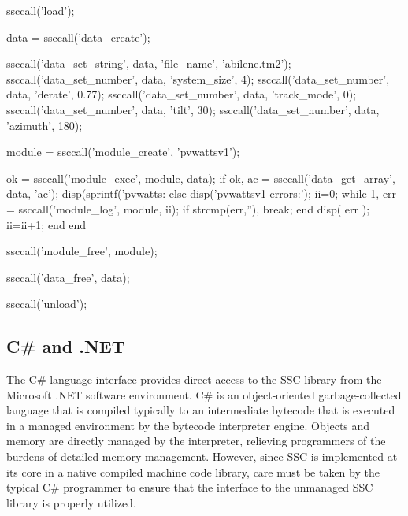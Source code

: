 \documentclass{scrartcl} %
\begin{document}
\begin{verbatimtab}[4]
ssccall('load');

data = ssccall('data_create');

ssccall('data_set_string', data, 'file_name', 'abilene.tm2');
ssccall('data_set_number', data, 'system_size', 4);
ssccall('data_set_number', data, 'derate', 0.77);
ssccall('data_set_number', data, 'track_mode', 0);
ssccall('data_set_number', data, 'tilt', 30);
ssccall('data_set_number', data, 'azimuth', 180);

module = ssccall('module_create', 'pvwattsv1');

ok = ssccall('module_exec', module, data);
if ok,
    ac = ssccall('data_get_array', data, 'ac');
    disp(sprintf('pvwatts: %
else
    disp('pvwattsv1 errors:');
    ii=0;
    while 1,
        err = ssccall('module_log', module, ii);
        if strcmp(err,''),
            break;
        end
        disp( err );
        ii=ii+1;
    end
end

ssccall('module_free', module);

ssccall('data_free', data);

ssccall('unload');
\end{verbatimtab}


\subsection{C\# and .NET}

The C\# language interface provides direct access to the SSC library from the Microsoft .NET software environment.  C\# is an object-oriented garbage-collected language that is compiled typically to an intermediate bytecode that is executed in a managed environment by the bytecode interpreter engine.  Objects and memory are directly managed by the interpreter, relieving programmers of the burdens of detailed memory management.  However, since SSC is implemented at its core in a native compiled machine code library, care must be taken by the typical C\# programmer to ensure that the interface to the unmanaged SSC library is properly utilized.
\end{document}
